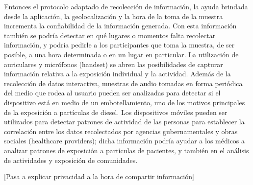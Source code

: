 	Entonces el protocolo adaptado de recolección de información, la ayuda brindada desde la aplicación, la geolocalización y la hora de la toma de la muestra incrementa la confiabilidad de la información generada. Con esta información también se podría detectar en qué lugares o momentos falta recolectar información, y podría pedirle a los participantes que toma la muestra, de ser posible, a una hora determinada o en un lugar en particular. La utilización de auriculares y micrófonos (handset) se abren las posibilidades de capturar información relativa a la exposición individual y la actividad. Además de la recolección de datos interactiva, muestras de audio tomadas en forma periódica del medio que rodea al usuario pueden ser analizadas para detectar si el dispositivo está en medio de un embotellamiento, uno de los motivos principales de la exposición a partículas de diesel. Los dispositivos móviles pueden ser utilizados para detectar patrones de actividad de las personas para establecer la correlación entre los datos recolectados por agencias gubernamentales y obras sociales (healthcare providers); dicha información podría ayudar a los médicos a analizar patrones de exposición a partículas de pacientes, y también en el análisis de actividades y exposición de comunidades. \cite{burke2006participatory}
	
	
	[Pasa a explicar privacidad a la hora de compartir información]